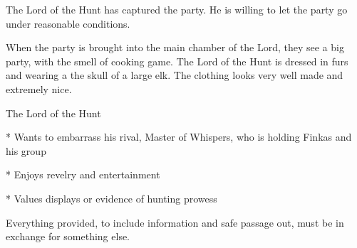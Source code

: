 The Lord of the Hunt has captured the party.
He is willing to let the party go under reasonable conditions.

When the party is brought into the main chamber of the Lord, they see a big party, with the smell of cooking game.
The Lord of the Hunt is dressed in furs and wearing a the skull of a large elk.
The clothing looks very well made and extremely nice.

The Lord of the Hunt

* Wants to embarrass his rival, Master of Whispers, who is holding Finkas and his group

* Enjoys revelry and entertainment

* Values displays or evidence of hunting prowess

Everything provided, to include information and safe passage out, must be in exchange for something else.
